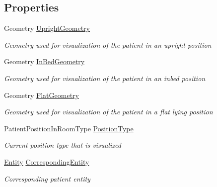 \subsection*{Properties}
\begin{DoxyCompactItemize}
\item 
Geometry \hyperlink{class_wpf_health_care_objects_1_1_draw_patient_a3f80edc921ff5783980814c69fb3be92}{Upright\+Geometry}
\begin{DoxyCompactList}\small\item\em Geometry used for visualization of the patient in an upright position \end{DoxyCompactList}\item 
Geometry \hyperlink{class_wpf_health_care_objects_1_1_draw_patient_afcca0dd2554cc574a74c48ccc47f5269}{In\+Bed\+Geometry}
\begin{DoxyCompactList}\small\item\em Geometry used for visualization of the patient in an inbed position \end{DoxyCompactList}\item 
Geometry \hyperlink{class_wpf_health_care_objects_1_1_draw_patient_a40fe44703a4433f9089f63a87563572d}{Flat\+Geometry}
\begin{DoxyCompactList}\small\item\em Geometry used for visualization of the patient in a flat lying position \end{DoxyCompactList}\item 
Patient\+Position\+In\+Room\+Type \hyperlink{class_wpf_health_care_objects_1_1_draw_patient_a8aeaabe27f049b0f857411eb2d61bb86}{Position\+Type}
\begin{DoxyCompactList}\small\item\em Current position type that is visualized \end{DoxyCompactList}\item 
\hyperlink{class_simulation_core_1_1_h_c_c_m_elements_1_1_entity}{Entity} \hyperlink{class_wpf_health_care_objects_1_1_draw_patient_a28007bb3945535d80d692740aabe28d5}{Corresponding\+Entity}
\begin{DoxyCompactList}\small\item\em Corresponding patient entity \end{DoxyCompactList}\end{DoxyCompactItemize}
